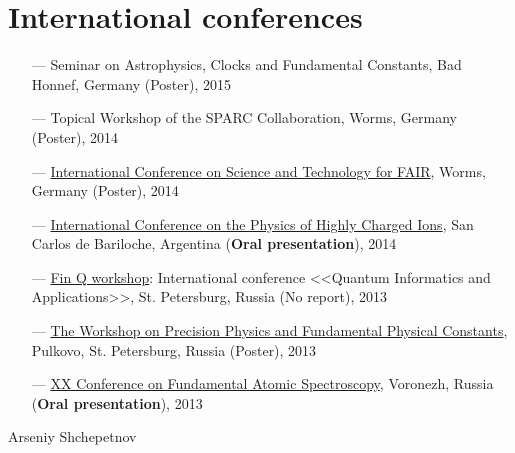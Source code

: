 \documentclass[10pt,a4paper]{article}
\begin{document}
	\section*{International conferences}
		\begin{itemize}
			\item[---]	Seminar on Astrophysics, Clocks and Fundamental Constants, Bad Honnef, Germany (Poster), 2015
			\item[---]	Topical Workshop of the SPARC Collaboration, Worms, Germany (Poster), 2014
			\item[---]	\href{http://indico.gsi.de/conferenceDisplay.py?confId=2443}{International Conference on Science and Technology for FAIR}, Worms, Germany (Poster), 2014
			\item[---]	\href{http://www.cab.cnea.gov.ar/hci2014/}{International Conference on the Physics of Highly Charged Ions}, San Carlos de Bariloche, Argentina (\textbf{Oral presentation}), 2014
			\item[---]	\href{https://sites.google.com/site/finqinternational/home}{Fin Q workshop}: International conference <<Quantum Informatics and Applications>>, St. Petersburg, Russia (No report), 2013
			\item[---]	\href{http://www.gao.spb.ru/russian/psas/ffk2013/}{The Workshop on Precision Physics and Fundamental Physical Constants}, Pulkovo, St. Petersburg, Russia (Poster), 2013
			\item[---]	\href{http://fas.vsu.ru/en/index.php}{XX Conference on Fundamental Atomic Spectroscopy}, Voronezh, Russia (\textbf{Oral presentation}), 2013
		\end{itemize}		
	
	\vspace{5cm}
	
	Arseniy Shchepetnov
	
	
	
	
\end{document}
